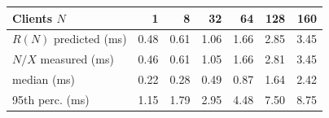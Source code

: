 \begin{tabular}{@{}lrrrrrr@{}}
\toprule
Clients $N$ & 1 & 8 & 32 & 64 & 128 & 160 \\
\midrule
$R(N)$ predicted (ms) & 0.48 & 0.61 & 1.06 & 1.66 & 2.85 & 3.45 \\
$N/X$ measured (ms) & 0.46 & 0.61 & 1.05 & 1.66 & 2.81 & 3.45 \\
median (ms) & 0.22 & 0.28 & 0.49 & 0.87 & 1.64 & 2.42 \\
95th perc. (ms) & 1.15 & 1.79 & 2.95 & 4.48 & 7.50 & 8.75 \\
\bottomrule
\end{tabular}
